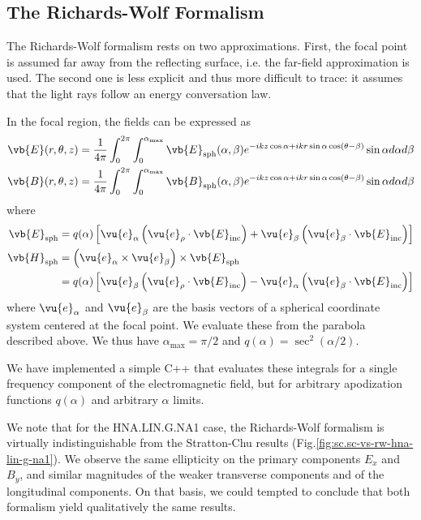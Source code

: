 \documentclass[11pt,SymmetricalJury]{inrsthesis/inrsthesis}
\begin{document}
\subsection{The Richards-Wolf Formalism}

The Richards-Wolf formalism rests on two approximations. First, the focal point
is assumed far away from the reflecting surface, i.e. the far-field approximation
is used. The second one is less explicit and thus more difficult to trace:
it assumes that the light rays follow an energy conversation law.

In the focal region, the fields can be expressed as \cite{April2012}
  \begin{align}
    \vb{E}(r,\theta,z) &= \frac{1}{4\pi}\int_0^{2\pi}\int_0^{\alpha_\text{max}}
        \vb{E}_\text{sph}(\alpha,\beta)e^{-ikz\cos\alpha+ikr\sin\alpha\cos(\theta-\beta)}
        \sin\alpha d\alpha d\beta \\
    \vb{B}(r,\theta,z) &= \frac{1}{4\pi}\int_0^{2\pi}\int_0^{\alpha_\text{max}}
        \vb{B}_\text{sph}(\alpha,\beta)e^{-ikz\cos\alpha+ikr\sin\alpha\cos(\theta-\beta)}
        \sin\alpha d\alpha d\beta
  \end{align}
where
  \begin{align}
    \vb{E}_\text{sph} &= q(\alpha)\left[\vu{e}_\alpha\left(\vu{e}_\rho\cdot\vb{E}_\text{inc}\right)
                                       +\vu{e}_\beta\left(\vu{e}_\beta\cdot\vb{E}_\text{inc}\right)
                                       \right] \\
    \vb{H}_\text{sph} &= \left(\vu{e}_\alpha\times\vu{e}_\beta\right)\times\vb{E}_\text{sph}\nonumber\\
                      &= q(\alpha) \left[\vu{e}_\beta\left(\vu{e}_\rho\cdot\vb{E}_\text{inc}\right)
                                        -\vu{e}_\alpha\left(\vu{e}_\beta\cdot\vb{E}_\text{inc}\right)
                                        \right]
  \end{align}
where $\vu{e}_\alpha$ and $\vu{e}_\beta$ are the basis vectors of a spherical
coordinate system centered at the focal point.
We evaluate these from the parabola described above. We thus have
$\alpha_\text{max}=\pi/2$ and $q(\alpha)=\sec^2(\alpha/2)$.

We have implemented a simple C++ that evaluates these integrals for a single
frequency component of the electromagnetic field, but for arbitrary
apodization functions $q(\alpha)$ and arbitrary $\alpha$ limits.

We note that for the HNA.LIN.G.NA1 case, the Richards-Wolf formalism is virtually
indistinguishable from the Stratton-Chu results (Fig.\ref{fig:sc.sc-vs-rw-hna-lin-g-na1}).
We observe the same ellipticity on the primary components $E_x$ and $B_y$, and
similar magnitudes of the weaker transverse components and of the longitudinal
components. On that basis, we could tempted to conclude that both formalism yield
qualitatively the same results.
\end{document}
